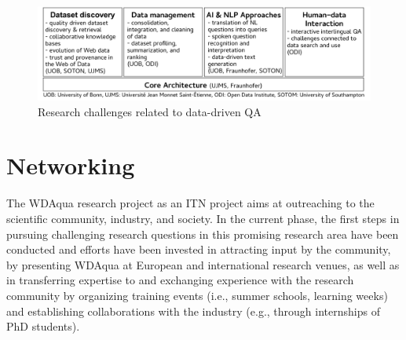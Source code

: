 \documentclass[a4paper]{llncs}
\begin{document}
	\begin{figure}[htpb!]
	    \centering
	    \includegraphics[width=\textwidth]{figure.pdf}
		\caption{Research challenges related to data-driven QA}
		\label{fig:figure}
	\end{figure}

	\section{Networking} \label{sec:networking}
	The WDAqua research project as an ITN project aims at outreaching to the scientific community, industry, and society.
        In the current phase, the first steps in pursuing challenging research questions in this promising research area have been conducted and efforts have been invested in attracting input by the community, by presenting WDAqua at European and international research venues, as well as in transferring expertise to and exchanging experience with the research community by organizing training events (i.e., summer schools, learning weeks) and establishing collaborations with the industry (e.g., through internships of PhD students).
	
\end{document}
